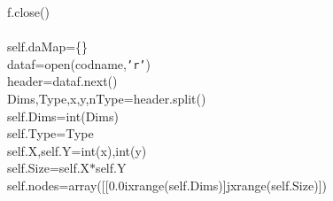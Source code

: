 {{\begin{tabbing}
\hspace{96pt}f.close()\\
\\
\hspace{96pt}self.daMap\hspace{6pt}=\hspace{6pt}\{\}\\
\hspace{48pt}dataf\hspace{6pt}=\hspace{6pt}open(codname,{\texttt{{'}r{'}}})\\
\hspace{48pt}header\hspace{6pt}=\hspace{6pt}dataf.next()\\
\hspace{48pt}Dims,Type,x,y,nType=\hspace{6pt}header.split()\\
\hspace{48pt}self.Dims\hspace{6pt}=\hspace{6pt}int(Dims)\\
\hspace{48pt}self.Type\hspace{6pt}=\hspace{6pt}Type\\
\hspace{48pt}self.X,\hspace{6pt}self.Y\hspace{6pt}=\hspace{6pt}int(x),int(y)\\
\hspace{48pt}self.Size\hspace{6pt}=\hspace{6pt}self.X$\ast$self.Y\\
\hspace{48pt}self.nodes\hspace{6pt}=\hspace{6pt}array({[}{[}0.0\hspace{6pt}i\hspace{6pt}xrange(self.Dims){]}\hspace{6pt}j\hspace{6pt}xrange(self.Size){]})\\

\end{tabbing}}}

